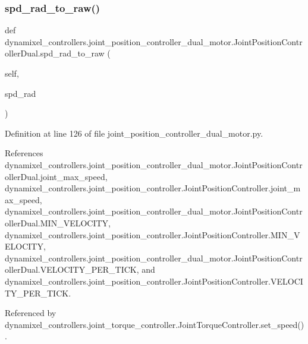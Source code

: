 \subsubsection{\texorpdfstring{spd\+\_\+rad\+\_\+to\+\_\+raw()}{spd\_rad\_to\_raw()}}
{\footnotesize\ttfamily def dynamixel\+\_\+controllers.\+joint\+\_\+position\+\_\+controller\+\_\+dual\+\_\+motor.\+Joint\+Position\+Controller\+Dual.\+spd\+\_\+rad\+\_\+to\+\_\+raw (\begin{DoxyParamCaption}\item[{}]{self,  }\item[{}]{spd\+\_\+rad }\end{DoxyParamCaption})}



Definition at line 126 of file joint\+\_\+position\+\_\+controller\+\_\+dual\+\_\+motor.\+py.



References dynamixel\+\_\+controllers.\+joint\+\_\+position\+\_\+controller\+\_\+dual\+\_\+motor.\+Joint\+Position\+Controller\+Dual.\+joint\+\_\+max\+\_\+speed, dynamixel\+\_\+controllers.\+joint\+\_\+position\+\_\+controller.\+Joint\+Position\+Controller.\+joint\+\_\+max\+\_\+speed, dynamixel\+\_\+controllers.\+joint\+\_\+position\+\_\+controller\+\_\+dual\+\_\+motor.\+Joint\+Position\+Controller\+Dual.\+M\+I\+N\+\_\+\+V\+E\+L\+O\+C\+I\+TY, dynamixel\+\_\+controllers.\+joint\+\_\+position\+\_\+controller.\+Joint\+Position\+Controller.\+M\+I\+N\+\_\+\+V\+E\+L\+O\+C\+I\+TY, dynamixel\+\_\+controllers.\+joint\+\_\+position\+\_\+controller\+\_\+dual\+\_\+motor.\+Joint\+Position\+Controller\+Dual.\+V\+E\+L\+O\+C\+I\+T\+Y\+\_\+\+P\+E\+R\+\_\+\+T\+I\+CK, and dynamixel\+\_\+controllers.\+joint\+\_\+position\+\_\+controller.\+Joint\+Position\+Controller.\+V\+E\+L\+O\+C\+I\+T\+Y\+\_\+\+P\+E\+R\+\_\+\+T\+I\+CK.



Referenced by dynamixel\+\_\+controllers.\+joint\+\_\+torque\+\_\+controller.\+Joint\+Torque\+Controller.\+set\+\_\+speed().


